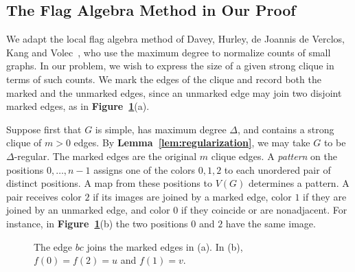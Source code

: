 \subsection{The Flag Algebra Method in Our Proof}\label{subsec:adapted-flags}

We adapt the local flag algebra method of Davey, Hurley, de Joannis de
Verclos, Kang and Volec~\cite{DaveyEtAlLocal2026,DaveyEtAlStrong2026},
who use the maximum degree to normalize counts of small graphs.
In our problem, we wish to express the size of a given strong clique
in terms of such counts. We mark the edges of the clique and record
both the marked and the unmarked edges, since an unmarked edge may
join two disjoint marked edges, as in \textbf{Figure~\ref{fig:marked-maps}}(a).

Suppose first that $G$ is simple, has maximum degree $\Delta$, and
contains a strong clique of $m>0$ edges. By
\textbf{Lemma~\ref{lem:regularization}}, we may take $G$ to be
$\Delta$-regular. The marked edges are the original $m$ clique edges.
A \emph{pattern} on the positions $0,\ldots,n-1$ assigns one of the
colors $0,1,2$ to each unordered pair of distinct positions.
A map from these positions to $V(G)$ determines a pattern. A pair
receives color $2$ if its images are joined by a marked edge, color
$1$ if they are joined by an unmarked edge, and color $0$ if they
coincide or are nonadjacent. For instance, in
\textbf{Figure~\ref{fig:marked-maps}}(b) the two positions $0$ and
$2$ have the same image.

\begin{figure}[htbp]
\centering
{}
\caption{The edge $bc$ joins the marked edges in (a).
In (b), $f(0)=f(2)=u$ and $f(1)=v$.}
\label{fig:marked-maps}
\end{figure}

